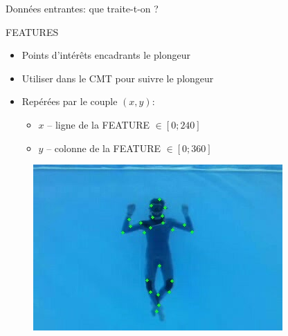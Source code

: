 \documentclass{bredelebeamer}
\begin{document}
\begin{frame}{Données entrantes: que traite-t-on ?}


\begin{block}{FEATURES}
\begin{itemize}
\item Points d'intér\^ets encadrants le plongeur
\item Utiliser dans le CMT pour suivre le plongeur
\item Repérées par le couple $(x,y)$:
	\begin{itemize}
		\item $x$ -- ligne de la FEATURE $\in \left[0;240\right]$
		\item $y$ -- colonne de la FEATURE $\in \left[0;360\right]$
	\end{itemize}
\end{itemize}
\end{block}

\begin{figure}
\centering
\includegraphics[scale=0.5]{images/plongeurInitFeatures.jpeg}
\end{figure}


\end{frame}

\end{document}
